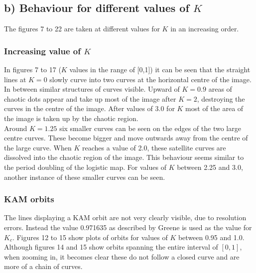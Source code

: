\documentclass{article}
\begin{document}
\subsection*{b) Behaviour for different values of $K$}

The figures 7 to 22 are taken at different values for $K$ in an increasing order.

\subsubsection*{Increasing value of $K$}
In figures 7 to 17 ($K$ values in the range of [0,1]) it can be seen that the straight lines at $K = 0$ slowly curve into two curves at the horizontal centre of the image. In between similar structures of curves visible.
Upward of $K = 0.9$ areas of chaotic dots appear and take up most of the image after $K = 2$, destroying the curves in the centre of the image.
After values of 3.0 for $K$ most of the area of the image is taken up by the chaotic region.\\
Around $K = 1.25$ six smaller curves can be seen on the edges of the two large centre curves. These become bigger and move outwards away from the centre of the large curve. When $K$ reaches a value of 2.0, these satellite curves are dissolved into the chaotic region of the image. This behaviour seems similar to the period doubling of the logistic map. For values of $K$ between 2.25 and 3.0, another instance of these smaller curves can be seen.

\subsubsection*{KAM orbits}
The lines displaying a KAM orbit are not very clearly visible, due to resolution errors. Instead the value 0.971635 as described by Greene\cite{kval} is used as the value for $K_c$. Figures 12 to 15 show plots of orbits for values of $K$ between 0.95 and 1.0. Although figures 14 and 15 show orbits spanning the entire interval of $[0,1]$, when zooming in, it becomes clear these do not follow a closed curve and are more of a chain of curves.
\end{document}
